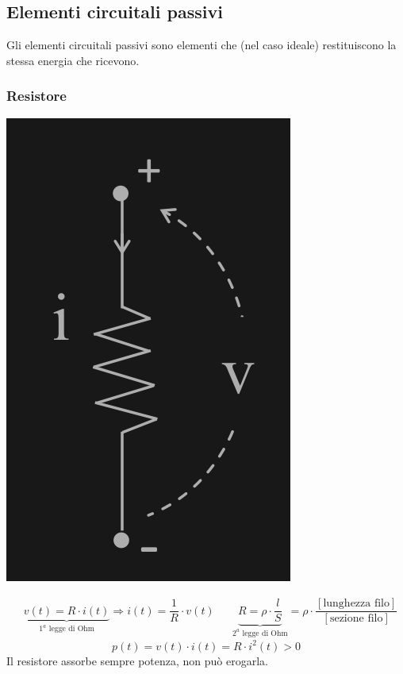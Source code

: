 \documentclass{article}
\begin{document}
\subsection{Elementi circuitali passivi}
Gli elementi circuitali passivi sono elementi che (nel caso ideale) restituiscono la stessa energia che ricevono. 
\subsubsection{Resistore}
\begin{center}
    \includegraphics[scale=0.22]{Image/Resistore.png}
\end{center}
\begin{align*}
    &\underbrace{v(t) = R \cdot i(t)}_{1^a\text{ legge di Ohm}} \Longrightarrow i(t) = \dfrac{1}{R} \cdot v(t) & &\underbrace{R = \rho \cdot \dfrac{l}{S}}_{2^a \text{ legge di Ohm}} = \rho \cdot  \dfrac{[\text{lunghezza filo}]}{[\text{sezione filo}]}
\end{align*}
\[
    p(t) = v(t) \cdot i(t) = R \cdot i^2(t) >0
\]
Il resistore assorbe sempre potenza, non può erogarla.
\end{document}
